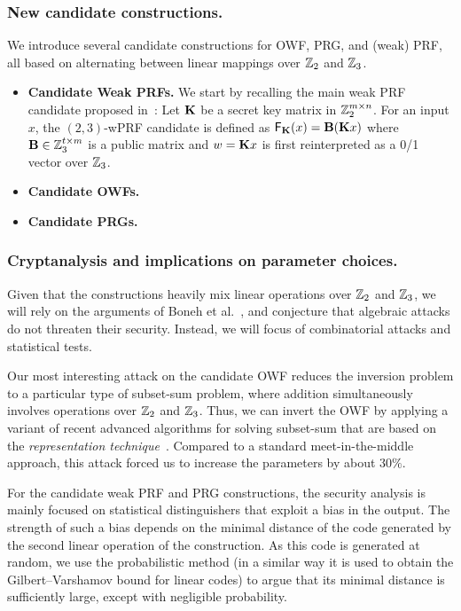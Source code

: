 \fi


\subsubsection{New candidate constructions.}
We introduce several candidate constructions for OWF, PRG, and (weak) PRF, all based on alternating between linear mappings over $\mathbb{Z}_2$ and $\mathbb{Z}_3$.

\begin{itemize}
    \item \textbf{Candidate Weak PRFs.}
    We start by recalling the main weak PRF candidate proposed in~\cite{boneh2018-darkmatter}:
    Let $\mat{K}$ be a secret key matrix in $\mathbb{Z}_2^{m \times n}$. For an input $x$, the $(2,3)$-wPRF candidate is defined as $\mathsf{F}_\mat{K}(x) = \mat{B}(\mat{K}x)$ where $\mat{B} \in \Z_3^{t \times m}$ is a public matrix and $w = \mat{K}x$ is first reinterpreted as a 0/1 vector over $\mathbb{Z}_3$. 


    \item \textbf{Candidate OWFs.} 

    \item \textbf{Candidate PRGs.}
\end{itemize}

\subsubsection{Cryptanalysis and implications on parameter choices.}
Given that the constructions heavily mix linear operations over $\mathbb{Z}_2$ and $\mathbb{Z}_3$, 
we will rely on the arguments of Boneh et al.~\cite{boneh2018-darkmatter}, 
and conjecture that algebraic attacks do not threaten their security.
Instead, we will focus of combinatorial attacks and statistical tests.

Our most interesting attack on the 
candidate OWF reduces the inversion problem to a particular type of subset-sum problem,
where addition simultaneously involves operations over $\mathbb{Z}_2$ and $\mathbb{Z}_3$.
Thus, we can invert the OWF by applying a variant of recent advanced algorithms
for solving subset-sum that are based on the 
\emph{representation technique}~\cite{Howgrave-GrahamJ10,BeckerCJ11,BonnetainBSS20}.
Compared to a standard meet-in-the-middle approach, 
this attack forced us to increase the parameters by about $30\%$.

For the candidate weak PRF and PRG constructions, 
the security analysis is mainly focused on
statistical distinguishers that exploit a bias in the output.
The strength of such a bias depends on the minimal distance of the 
code generated by the second linear operation of the construction.
As this code is generated at random, we use the probabilistic method
(in a similar way it is used to obtain the Gilbert–Varshamov bound for linear codes) 
to argue that its minimal distance is sufficiently large, except with negligible probability. 

